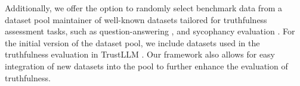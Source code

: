 Additionally, we offer the option to randomly select benchmark data from a dataset pool maintainer of well-known datasets tailored for truthfulness assessment tasks, such as question-answering \cite{rajpurkar2018know, yang2018hotpotqa}, and sycophancy evaluation \cite{sycophancygithub}. For the initial version of the dataset pool, we include datasets used in the truthfulness evaluation in TrustLLM \cite{huang2024position}. Our framework also allows for easy integration of new datasets into the pool to further enhance the evaluation of truthfulness.








